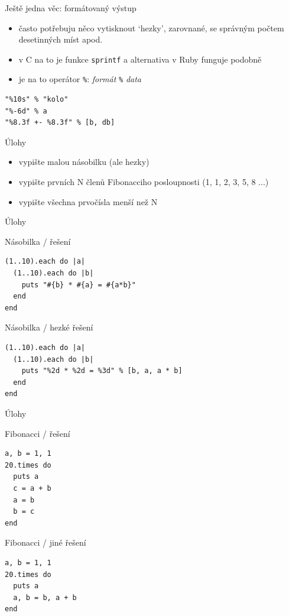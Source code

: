 \documentclass{beamer}
\begin{document}
\begin{frame}[fragile]{Ještě jedna věc: formátovaný výstup}
  \begin{itemize}
    \item často potřebuju něco vytisknout `hezky', zarovnané, se správným počtem desetinných míst apod.
    \item v C na to je funkce \texttt{sprintf} a alternativa v Ruby funguje podobně
    \item je na to operátor \texttt{\%}: \emph{formát} \texttt{\%} \emph{data}
  \end{itemize}
  {\small
  \begin{verbatim}
"%10s" % "kolo"
"%-6d" % a
"%8.3f +- %8.3f" % [b, db]
  \end{verbatim}
  }
\end{frame}

\begin{frame}{Úlohy}
  \begin{itemize}
    \item vypište malou násobilku (ale hezky)
    \item vypište prvních N členů Fibonacciho posloupnosti (1, 1, 2, 3, 5, 8 ...)
    \item vypište všechna prvočísla menší než N
  \end{itemize}
\end{frame}

\begin{frame}[fragile]{Úlohy}
  \begin{block}{Násobilka / řešení}
\begin{verbatim}
(1..10).each do |a|
  (1..10).each do |b|
    puts "#{b} * #{a} = #{a*b}"
  end
end
\end{verbatim}
  \end{block}
  \pause
  \begin{block}{Násobilka / hezké řešení}
\begin{verbatim}
(1..10).each do |a|
  (1..10).each do |b|
    puts "%2d * %2d = %3d" % [b, a, a * b]
  end
end
\end{verbatim}
  \end{block}
\end{frame}

\begin{frame}[fragile]{Úlohy}
  \begin{block}{Fibonacci / řešení} \footnotesize
\begin{verbatim}
a, b = 1, 1
20.times do
  puts a
  c = a + b
  a = b
  b = c
end
\end{verbatim}
  \end{block}
  \begin{block}{Fibonacci / jiné řešení} \footnotesize
\begin{verbatim}
a, b = 1, 1
20.times do
  puts a
  a, b = b, a + b
end
\end{verbatim}
  \end{block}
\end{frame}
\end{document}
